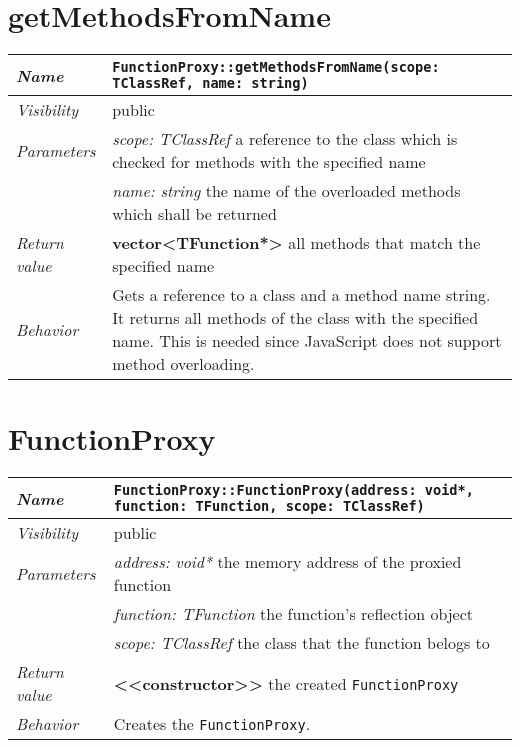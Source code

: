 \section{getMethodsFromName}
\begin{longtable}{p{3cm} @{\hskip 1cm} p{12cm}}
	\hline

	\textit{Name} & \texttt{FunctionProxy::getMethodsFromName(scope: TClassRef, name: string)}\\
	\hline

	\textit{Visibility} & public\\
	\hline

	\textit{Parameters} & \textit{scope: TClassRef} a reference to the class which is checked for methods with the specified name\\
		& \textit{name: string} the name of the overloaded methods which shall be returned\\
	\hline

	\textit{Return value} & \textbf{vector<TFunction*>} all methods that match the specified name\\
	\hline

	\textit{Behavior} & Gets a reference to a class and a method name string. It returns all methods of the class with the specified name. This is needed since JavaScript does not support method overloading.\\
	\hline

\end{longtable} \pagebreak

\section{FunctionProxy}
\begin{longtable}{p{3cm} @{\hskip 1cm} p{12cm}}
	\hline

	\textit{Name} & \texttt{FunctionProxy::FunctionProxy(address: void*, function: TFunction, scope: TClassRef)}\\
	\hline

	\textit{Visibility} & public\\
	\hline

	\textit{Parameters} & \textit{address: void*} the memory address of the proxied function\\
		& \textit{function: TFunction} the function's reflection object\\
		& \textit{scope: TClassRef} the class that the function belogs to\\
	\hline

	\textit{Return value} & \textbf{<<constructor>>} the created \texttt{FunctionProxy}\\
	\hline

	\textit{Behavior} & Creates the \texttt{FunctionProxy}.\\
	\hline

\end{longtable} \pagebreak

